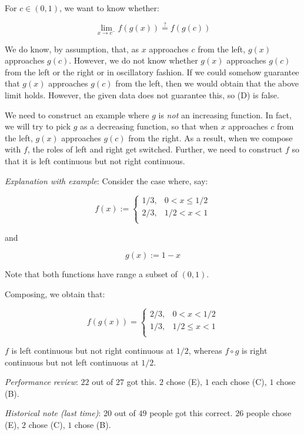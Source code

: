 \documentclass[10pt]{amsart}
\begin{document}
\begin{enumerate}
  For $c \in (0,1)$, we want to know whether:

  $$\displaystyle \lim_{x \to c^-} f(g(x)) \stackrel{?}{=} f(g(c))$$

  We do know, by assumption, that, as $x$ approaches $c$ from the
  left, $g(x)$ approaches $g(c)$. However, we do not know whether
  $g(x)$ approaches $g(c)$ from the left or the right or in
  oscillatory fashion. If we could somehow guarantee that $g(x)$
  approaches $g(c)$ from the left, then we would obtain that the above
  limit holds. However, the given data does not guarantee this, so (D)
  is false.

  We need to construct an example where $g$ is {\em not} an increasing
  function. In fact, we will try to pick $g$ as a decreasing function,
  so that when $x$ approaches $c$ from the left, $g(x)$ approaches
  $g(c)$ from the right. As a result, when we compose with $f$, the
  roles of left and right get switched. Further, we need to construct
  $f$ so that it is left continuous but not right continuous.

  {\em Explanation with example}: Consider the case where, say:

  $$f(x) := \left \lbrace\begin{array}{rl}1/3,& 0 < x \le 1/2 \\ 2/3, & 1/2 < x < 1 \\\end{array}\right.$$

  and

  $$g(x) := 1 - x$$

  Note that both functions have range a subset of $(0,1)$.

  Composing, we obtain that:

  $$f(g(x)) = \left \lbrace\begin{array}{rl}2/3,& 0 < x < 1/2\\ 1/3, & 1/2 \le x < 1 \\\end{array}\right.$$

  $f$ is left continuous but not right continuous at $1/2$, whereas $f
  \circ g$ is right continuous but not left continuous at $1/2$.

  {\em Performance review}: $22$ out of $27$ got this. $2$ chose (E),
  $1$ each chose (C), $1$ chose (B).

  {\em Historical note (last time)}: $20$ out of $49$ people got this
  correct. $26$ people chose (E), $2$ chose (C), $1$ chose (B).



\end{enumerate}
\end{document}
